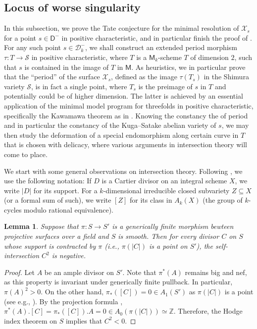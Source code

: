 \documentclass[11pt, letterpaper]{amsart}
\theoremstyle{plain}
\newtheorem{lemma}[theorem]{Lemma}
\theoremstyle{definition}
\newcommand{\IZ}{\mathbb{Z}}
\newcommand{\<}{\langle}
\renewcommand{\>}{\rangle}
\newcommand{\shS}{\mathscr{S}}
\newcommand{\sfD}{\mathsf{D}}
\newcommand{\sfM}{\mathsf{M}}
\newcommand{\sX}{\mathcal{X}}
\newcommand{\sD}{\mathcal{D}}
\begin{document}
\subsection{Locus of worse singularity}
\label{sub:bad_points}
In this subsection, we prove the Tate conjecture for the minimal resolution of $\sX_s$ for a point $s\in \sfD^-$ in positive characteristic, and in particular finish the proof of .
For any such point $s\in \sD^-_k$, we shall construct an extended period morphism $\tau:T\to \shS$ in positive characteristic, where $T$ is a $\sfM_k$-scheme $T$ of dimension $2$, such that $s$ is contained in the image of $T$ in $\sfM$.
As heuristics, we in particular prove that the ``period'' of the surface $\sX_s$, defined as the image $\tau(T_s)$ in the Shimura variety $\shS$, is in fact a single point, where $T_s$ is the preimage of $s$ in $T$ and potentially could be of higher dimension.
The latter is achieved by an essential application of the minimal model program for threefolds in positive characteristic, specifically the Kawamawa theorem as in .
Knowing the constancy the of period and in particular the constancy of the Kuga--Satake abelian variety of $s$, we may then study the deformation of a special endomorphism along certain curve in $T$ that is chosen with delicacy, where various arguments in intersection theory will come to place.

We start with some general observations on intersection theory. 
Following \cite{Fulton}, we use the following notation: If $D$ is a Cartier divisor on an integral scheme $X$, we write $|D|$ for its support.
For a $k$-dimensional irreducible closed subvariety $Z \subseteq X$ (or a formal sum of such), we write $[Z]$ for its class in $A_k(X)$ (the group of $k$-cycles modulo rational equivalence). 
\begin{lemma}
\label{lem: neg self intersection}
    Suppose that $\pi : S \to S'$ is a generically finite morphism bewteen projective surfaces over a field and $S$ is smooth. Then for every divisor $C$ on $S$ whose support is contracted by $\pi$ (i.e., $\pi(|C|)$ is a point on $S'$), the self-intersection $C^2$ is negative. 
\end{lemma}
\begin{proof}
Let $A$ be an ample divisor on $S'$. Note that $\pi^*(A)$ remains big and nef, as this property is invariant under generically finite pullback. In particular, $\pi(A)^2 > 0$. On the other hand, $\pi_*([C]) = 0 \in A_1(S')$ as $\pi(|C|)$ is a point (see e.g., \cite[\S1.4]{Fulton}). By the projection formula \cite[Prop.~2.3(c)]{Fulton}, $\pi^*(A) . [C] = \pi_*([C]) . A = 0 \in A_0( \pi(|C|)) \simeq \IZ$. Therefore, the Hodge index theorem on $S$ implies that $C^2 < 0$. 
\end{proof}
\end{document}
